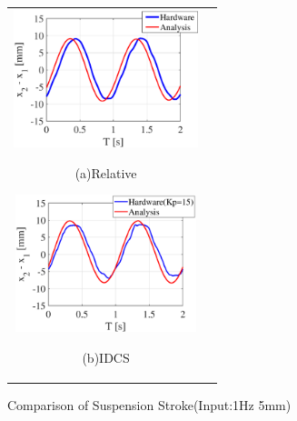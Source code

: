 \documentclass[a4paper,12pt]{article_vdlab_sotsuron}
\begin{document}
\vspace{5mm}
\begin{figure}[h]
  \begin{tabular}{cc}
  \begin{minipage}{0.5\hsize}
  \begin{center}
    \includegraphics[height=40mm]{figure/hils_rela_5_1.eps}
    \end{center}
    \begin{center}
    \ (a)Relative\
    \end{center}
  \end{minipage}
  \begin{minipage}{0.5\hsize}
     \begin{center}
      \includegraphics[height=40mm]{figure/hils_idcs_5_1.eps}
      \end{center}
      \begin{center}
      \ (b)IDCS\
    \end{center}
  \end{minipage}
  \end{tabular}
  \vspace*{2mm}
  \caption{Comparison of Suspension Stroke(Input:1Hz 5mm)}
    \label{fig:hils_5_1}
\end{figure}
\end{document}
